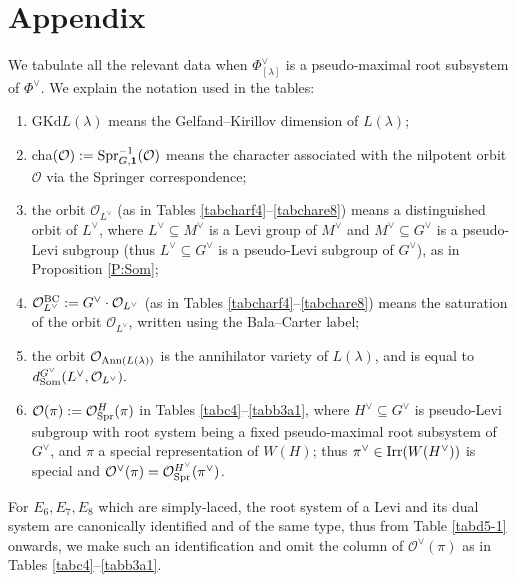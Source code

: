 \documentclass[reqno,12pt]{amsart}
\numberwithin{equation}{section}
\theoremstyle{plain}
\theoremstyle{definition}
\newcommand{\lam}{\lambda}
\renewcommand{\subset}{\subseteq}
\begin{document}
\section{Appendix}
We tabulate all the relevant data when $\Phi_{[\lambda]}^\vee$ is a pseudo-maximal root subsystem of $\Phi^\vee$.
We explain the notation used in the tables:
\begin{enumerate}
    \item[$\bullet$] $\mathrm{GKd} L(\lambda)$ means the Gelfand--Kirillov dimension of $L(\lam)$;
    \item[$\bullet$] cha$(\mathcal{O}):={\rm Spr}_{G,\mathbf{1}}^{-1}(\mathcal{O})$ means the character associated with the nilpotent orbit $\mathcal{O}$ via the Springer correspondence;
    \item[$\bullet$] the orbit $\mathcal{O}_{L^\vee}$ (as in Tables \ref{tabcharf4}--\ref{tabchare8}) means a distinguished orbit of $L^\vee$, where $L^\vee \subset M^\vee$ is a Levi group of $M^\vee$ and $M^\vee \subseteq G^\vee$ is a pseudo-Levi subgroup (thus $L^\vee \subseteq G^\vee$ is a pseudo-Levi subgroup of $G^\vee$), as in Proposition \ref{P:Som}; 
    \item[$\bullet$] $\mathcal{O}_{L^\vee}^{\rm BC}:=G^\vee \cdot \mathcal{O}_{L^\vee}$ (as in Tables \ref{tabcharf4}--\ref{tabchare8}) means the saturation of the orbit $\mathcal{O}_{L^\vee}$, written using the Bala--Carter label;
    \item[$\bullet$] the orbit $\mathcal{O}_{{\rm Ann}(L(\lambda))}$ is the annihilator variety of $L(\lambda)$, and is equal to $d_{\rm Som}^{G^\vee}(L^{\vee}, \mathcal{O}_{L^\vee}).$
    \item[$\bullet$] $\mathcal{O}(\pi):=\mathcal{O}_{\rm Spr}^H(\pi)$ in Tables \ref{tabc4}--\ref{tabb3a1}, where $H^\vee \subseteq G^\vee$ is pseudo-Levi subgroup with root system being  a fixed pseudo-maximal root subsystem of $G^\vee$, and $\pi$ a special representation of $W(H)$; thus $\pi^\vee \in {\rm Irr}(W(H^\vee))$ is special and $\mathcal{O}^\vee(\pi) = \mathcal{O}_{\rm Spr}^{H^\vee}(\pi^\vee)$. 
\end{enumerate}
For $E_6, E_7, E_8$ which are simply-laced, the root system of a Levi and its dual system are canonically identified and of the same type, thus from Table \ref{tabd5-1} onwards, we make such an identification and omit the column of $\mathcal{O}^\vee(\pi)$ as in Tables \ref{tabc4}--\ref{tabb3a1}.
\end{document}

